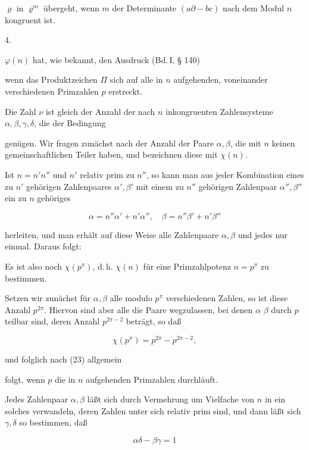 $\varrho$ in $\varrho^m$ übergeht, wenn $m$ der Determinante $(a\partial - bc)$ nach dem Modul $n$ kongruent ist.

4. 

$\varphi(n)$ hat, wie bekannt, den Ausdruck (Bd.\,I, § 140)


wenn das Produktzeichen $\varPi$ sich auf alle in $n$ aufgehenden, voneinander verschiedenen Primzahlen $p$ erstreckt.

Die Zahl $\nu$ ist gleich der Anzahl der nach $n$ inkongruenten Zahlensysteme $\alpha, \beta, \gamma, \delta$, die der Bedingung


genügen. Wir fragen zunächst nach der Anzahl der Paare $\alpha, \beta$, die mit $n$ keinen gemeinschaftlichen Teiler haben, und bezeichnen diese mit $\chi(n)$.

Ist $n = n'n''$ und $n'$ relativ prim zu $n''$, so kann man aus jeder Kombination eines zu $n'$ gehörigen Zahlenpaares $\alpha', \beta'$ mit einem zu $n''$ gehörigen Zahlenpaar $\alpha'', \beta''$ ein zu $n$ gehöriges

\[
\alpha = n''\alpha' + n'\alpha'', \quad \beta = n''\beta' + n'\beta''
\]

herleiten, und man erhält auf diese Weise alle Zahlenpaare $\alpha, \beta$ und jedes nur einmal. Daraus folgt:


Es ist also noch $\chi(p^\pi)$, d.\,h. $\chi(n)$ für eine Primzahlpotenz $n = p^\pi$ zu bestimmen.

Setzen wir zunächst für $\alpha, \beta$ alle modulo $p^\pi$ verschiedenen Zahlen, so ist diese Anzahl $p^{2\pi}$. Hiervon sind aber alle die Paare wegzulassen, bei denen $\alpha$  $\beta$ durch $p$ teilbar sind, deren Anzahl $p^{2\pi-2}$ beträgt, so daß

\[
\chi(p^\pi) = p^{2\pi} - p^{2\pi-2},
\]

und folglich nach (23) allgemein


folgt, wenn $p$ die in $n$ aufgehenden Primzahlen durchläuft.

Jedes Zahlenpaar $\alpha, \beta$ läßt sich durch Vermehrung um Vielfache von $n$ in ein solches verwandeln, deren Zahlen unter sich relativ prim sind, und dann läßt sich $\gamma, \delta$ so bestimmen, daß

\[
\alpha\delta - \beta\gamma = 1
\]
